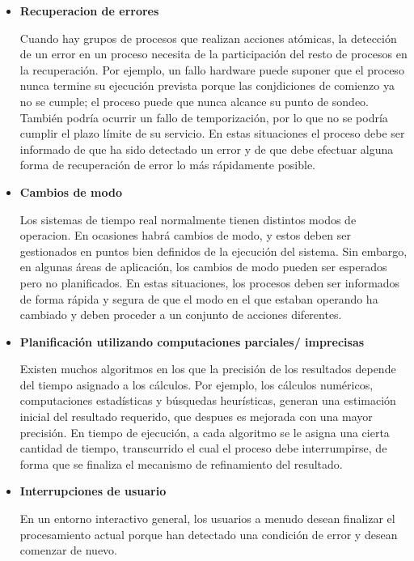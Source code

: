 \begin{itemize}
	\item \textbf{Recuperacion de errores}
		
		Cuando hay grupos de procesos que
		realizan acciones atómicas, la detección de un error en un
		proceso necesita de la participación del resto de procesos en la
		recuperación. Por ejemplo, un fallo hardware puede suponer que
		el proceso nunca termine su ejecución prevista porque las
		conjdiciones de comienzo ya no se cumple; el proceso puede que
		nunca alcance su punto de sondeo. También podría ocurrir un
		fallo de temporización, por lo que no se podría cumplir el plazo
		límite de su servicio. En estas situaciones el proceso debe ser
		informado de que ha sido detectado un error y de que debe
		efectuar alguna forma de recuperación de error lo más
		rápidamente posible.

	\item \textbf{Cambios de modo}
		
		Los sistemas de tiempo real normalmente tienen
		distintos modos de operacion. En ocasiones habrá cambios de
		modo, y estos deben ser gestionados en puntos bien definidos de
		la ejecución del sistema. Sin embargo, en algunas áreas de
		aplicación, los cambios de modo pueden ser esperados pero no
		planificados. En estas situaciones, los procesos deben ser
		informados de forma rápida y segura de que el modo en el que
		estaban operando ha cambiado y deben proceder a un conjunto de
		acciones diferentes.

	\item \textbf{Planificación utilizando computaciones parciales/
		imprecisas}

		Existen muchos algoritmos en los que la precisión de los
		resultados depende del tiempo asignado a los cálculos. Por
		ejemplo, los cálculos numéricos, computaciones estadísticas y
		búsquedas heurísticas, generan una estimación inicial del
		resultado requerido, que despues es mejorada con una mayor
		precisión. En tiempo de ejecución, a cada algoritmo se le asigna
		una cierta cantidad de tiempo, transcurrido el cual el proceso
		debe interrumpirse, de forma que se finaliza el mecanismo de
		refinamiento del resultado.

	\item \textbf{Interrupciones de usuario}
		
		En un entorno interactivo general, los
		usuarios a menudo desean finalizar el procesamiento actual
		porque han detectado una condición de error y desean comenzar de
		nuevo.
\end{itemize}
